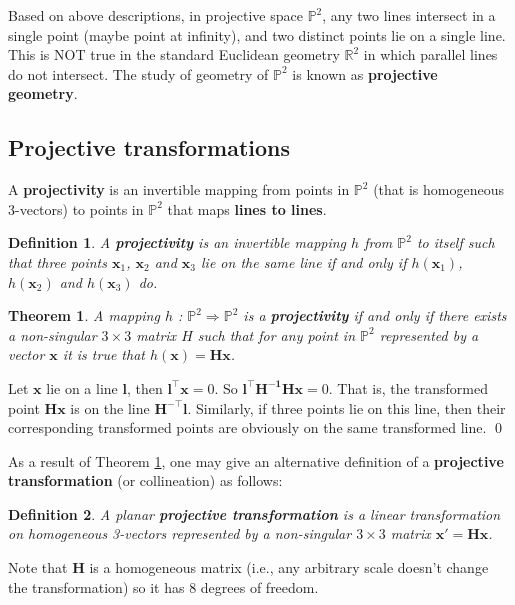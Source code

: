 \documentclass[12pt]{article}
\newtheorem{theorem}{Theorem}[section]
\newtheorem{definition}{Definition}[section]
\numberwithin{equation}{section}
\renewenvironment{proof}{{\bfseries Proof.}}{\qed \\}
\begin{document}
Based on above descriptions, in projective space $\mathbb{P}^2$, any two lines intersect in a single point (maybe point at infinity), and two distinct points lie on a single line. This is NOT true in the standard Euclidean geometry $\mathbb{R}^2$ in which parallel lines do not intersect. The study of geometry of $\mathbb{P}^2$ is known as \textbf{projective geometry}.

\subsection{Projective transformations}

A \textbf{projectivity} is an invertible mapping from points in $\mathbb{P}^2$ (that is homogeneous 3-vectors) to points in $\mathbb{P}^2$ that maps \textbf{lines to lines}. \\

\begin{definition}
A \textbf{projectivity} is an invertible mapping $h$ from $\mathbb{P}^2$ to itself such that
three points $\mathbf{x}_1$, $\mathbf{x}_2$ and $\mathbf{x}_3$ lie on the same line if and only if $h(\mathbf{x}_1)$, $h(\mathbf{x}_2)$ and $h(\mathbf{x}_3)$ do. \\
\label{def:projectivity}
\end{definition}

\begin{theorem}
A mapping $h$ : $\mathbb{P}^2 \Rightarrow \mathbb{P}^2$ is a \textbf{projectivity} if and only if there exists a non-singular $3 \times 3$ matrix $H$ such that for any point in $\mathbb{P}^2$ represented by a vector $\mathbf{x}$ it is true that $h(\mathbf{x}) = \mathbf{Hx}$.
\label{theorem:projectivity}
\end{theorem}
\begin{proof}
Let $\mathbf{x}$ lie on a line $\mathbf{l}$, then $\mathbf{l^\top x} = 0$. So $\mathbf{l^\top H^{-1} Hx} = 0$. That is, the transformed point $\mathbf{Hx}$ is on the line $\mathbf{H^{-\top}l}$. Similarly, if three points lie on this line, then their corresponding transformed points are obviously on the same transformed line.
\end{proof}

As a result of Theorem \ref{theorem:projectivity}, one may give an alternative definition of a \textbf{projective transformation} (or collineation) as follows:\\

\begin{definition}
A planar \textbf{projective transformation} is a linear transformation on homogeneous 3-vectors represented by a non-singular $3 \times 3$ matrix $\mathbf{x}' = \mathbf{Hx}$.
\label{def:proj_trans}
\end{definition}
Note that $\mathbf{H}$ is a homogeneous matrix (i.e., any arbitrary scale doesn't change the transformation) so it has 8 degrees of freedom.
\end{document}
